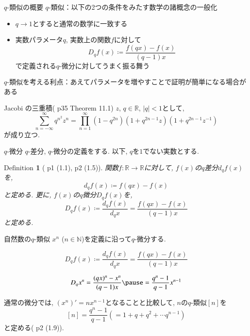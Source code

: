 \documentclass[dvipdfmx,cjk]{beamer}
\theoremstyle{mystyle}
\newtheorem{df}{$\textrm{Definition}$}[section]
\newcommand{\N}{\mathbb{N}}
\newcommand{\R}{\mathbb{R}}
\newcommand{\0}{\textbf{0}}
\begin{document}
\begin{frame}
  \tableofcontents[currentsection] 
\end{frame}

\begin{frame}{$q$-類似の概要}
  $q$-類似：以下の2つの条件をみたす数学の諸概念の一般化 \pause
  \begin{itemize}
    \item $q \to 1$とすると通常の数学に一致する \pause
    \item 実数パラメータ$q$, 実数上の関数$f$に対して
      \[
        D_q f(x) \coloneqq \frac{f(qx) - f(x)}{(q - 1) x}
      \]
    で定義される$q$-微分に対してうまく振る舞う \pause
  \end{itemize}
  $q$-類似を考える利点：あえてパラメータを増やすことで証明が簡単になる場合がある \pause
  \begin{itembox}{Jacobi の三重積(\cite{Kac} p35 Theorem 11.1)}
    $z$, $q \in \R$, $|q| < 1$として, 
    \[
      \sum_{n = -\infty}^{\infty} q^{n^2} z^n =
      \prod_{n = 1}^{\infty} (1 - q^{2n})(1 + q^{2n - 1}z)(1 + q^{2n - 1}z^{-1})
    \]
    が成り立つ. 
  \end{itembox}
\end{frame}

\begin{frame}{$q$-微分}
  $q$-差分, $q$-微分の定義をする. 以下, $q$を$1$でない実数とする. \pause
  \begin{df}[\cite{Kac} p1 (1.1), p2 (1.5)]
    関数$f : \R \to \R$に対して, $f(x)$の$q$差分$d_q f(x)$を, 
    \[
      d_q f(x) \coloneqq f (qx) - f(x)
    \]
    と定める. 更に, $f(x)$の$q$微分$D_q f(x)$を, 
    \[
      D_q f(x) \coloneqq \frac{d_q f(x)}{d_q x} = \frac{f(qx) - f(x)}{(q - 1) x}
    \]
    と定める. 
  \end{df}
\end{frame}

%

\begin{frame}{自然数の$q$-類似}
	$x^n$ ($n \in \N$)を定義に沿って$q$-微分する. \pause
	\begin{screen}
		\[
			D_q f(x) \coloneqq \frac{d_q f(x)}{d_q x} = \frac{f(qx) - f(x)}{(q - 1) x}
		\]
	\end{screen} \pause
	\[
		D_q x^n = \frac{(qx)^n - x^n}{(q - 1) x} \pause
					= \frac{q^n - 1}{q - 1} x^{n - 1}
	\] \pause
  
  通常の微分では, $(x^n)' = n x^{n - 1}$となることと比較して, \pause
  $n$の$q$-類似$[n]$を
  \[
    [n] = \frac{q^n - 1}{q - 1} (= 1 + q + q^2 + \cdots q^{n - 1})
  \]
  と定める(\cite{Kac} p2 (1.9)).
\end{frame}
\end{document}
